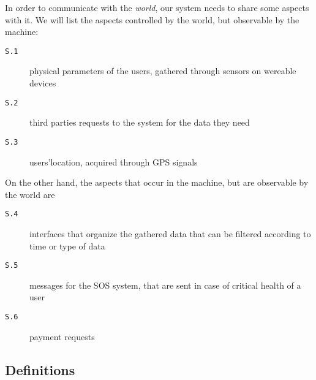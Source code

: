 \documentclass[../DD0.tex]{subfiles}
\begin{document}
      In order to communicate with the \textit{world}, our system needs to share some aspects with it. We will list the aspects controlled by the world, but observable by the machine:
      \begin{description}
        \item[\texttt{S.1}] physical parameters of the users, gathered through sensors on wereable devices
        \item[\texttt{S.2}] third parties requests to the system for the data they need
        \item[\texttt{S.3}] users'location, acquired through GPS signals
      \end{description}
      On the other hand, the aspects that occur in the machine, but are observable by the world are
      \begin{description}
        \item[\texttt{S.4}] interfaces that organize the gathered data that can be filtered according to time or type of data
        \item[\texttt{S.5}] messages for the SOS system, that are sent in case of critical health of a user
        \item[\texttt{S.6}] payment requests
      \end{description}

  \subsection{Definitions}
  \label{sec:definitions}
\end{document}
